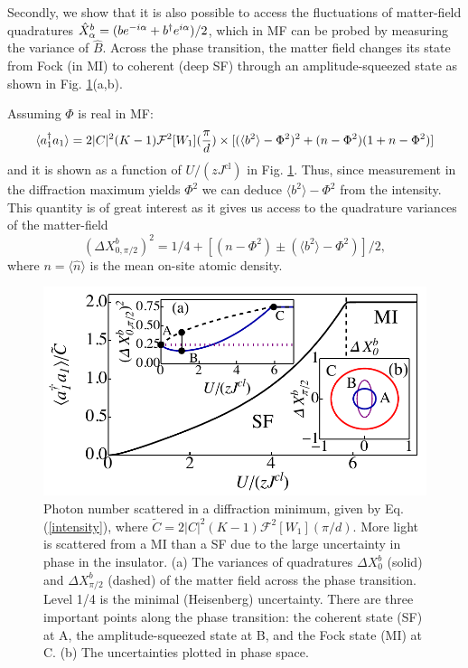 Secondly, we show that it is also possible to access the fluctuations
of matter-field quadratures $\hat{X}^b_\alpha = (b e^{-i\alpha} + b^\dagger
e^{i\alpha})/2$, which in MF can be probed by measuring the variance
of $\hat{B}$. Across the phase transition, the matter field changes
its state from Fock (in MI) to coherent (deep SF) through an
amplitude-squeezed state as shown in Fig. \ref{Quads}(a,b). 

Assuming $\Phi$ is real in MF:
\begin{equation}
  \label{intensity} 
  \langle a^\dagger_1 a_1 \rangle = 2 |C|^2(K-1)\mathcal{F}^2[W_1](\frac{\pi}{d})
  \times [ ( \langle b^2 \rangle - \Phi^2 )^2 + ( n - \Phi^2 ) ( 1 +n - \Phi^2 ) ]
\end{equation} 
and it is shown as a function of $U/(zJ^\text{cl})$ in
Fig. \ref{Quads}. Thus, since measurement in the diffraction maximum
yields $\Phi^2$ we can deduce $\langle b^2 \rangle - \Phi^2$ from the
intensity. This quantity is of great interest as it gives us access to
the quadrature variances of the matter-field
\begin{equation} 
  (\Delta X^b_{0,\pi/2})^2 = 1/4 + [(n - \Phi^2) \pm
  (\langle b^2 \rangle - \Phi^2)]/2,
\end{equation} 
where $n=\langle\hat{n}\rangle$ is the mean on-site atomic density.

\begin{figure}[htbp!]
  \centering
  \includegraphics[width=\linewidth]{Quads}
  \captionsetup{justification=centerlast,font=small}
  \caption[Mean-Field Matter Quadratures]{Photon number scattered in a
    diffraction minimum, given by Eq. (\ref{intensity}), where
    $\tilde{C} = 2 |C|^2 (K-1) \mathcal{F}^2 [W_1](\pi/d)$.  More
    light is scattered from a MI than a SF due to the large
    uncertainty in phase in the insulator. (a) The variances of
    quadratures $\Delta X^b_0$ (solid) and $\Delta X^b_{\pi/2}$
    (dashed) of the matter field across the phase transition. Level
    1/4 is the minimal (Heisenberg) uncertainty. There are three
    important points along the phase transition: the coherent state
    (SF) at A, the amplitude-squeezed state at B, and the Fock state
    (MI) at C. (b) The uncertainties plotted in phase space.}
	\label{Quads}
\end{figure}


